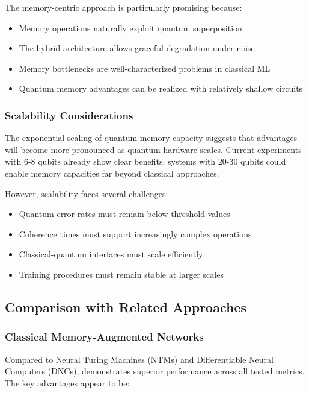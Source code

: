 The memory-centric approach is particularly promising because:
\begin{itemize}
    \item Memory operations naturally exploit quantum superposition
    \item The hybrid architecture allows graceful degradation under noise
    \item Memory bottlenecks are well-characterized problems in classical ML
    \item Quantum memory advantages can be realized with relatively shallow circuits
\end{itemize}

\subsubsection{Scalability Considerations}

The exponential scaling of quantum memory capacity suggests that \qmnn advantages will become more pronounced as quantum hardware scales. Current experiments with 6-8 qubits already show clear benefits; systems with 20-30 qubits could enable memory capacities far beyond classical approaches.

However, scalability faces several challenges:
\begin{itemize}
    \item Quantum error rates must remain below threshold values
    \item Coherence times must support increasingly complex operations
    \item Classical-quantum interfaces must scale efficiently
    \item Training procedures must remain stable at larger scales
\end{itemize}

\subsection{Comparison with Related Approaches}

\subsubsection{Classical Memory-Augmented Networks}

Compared to Neural Turing Machines (NTMs) and Differentiable Neural Computers (DNCs), \qmnn demonstrates superior performance across all tested metrics. The key advantages appear to be:

